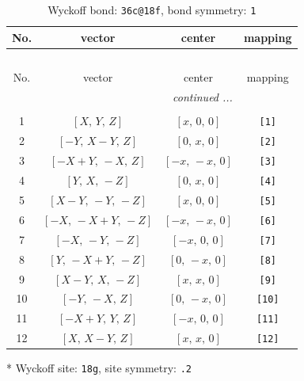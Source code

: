 \documentclass[fleqn,8pt]{jsarticle}
\begin{document}
\begin{longtable}{cccc}
\caption{Wyckoff bond: {\tt 36c@18f}, bond symmetry: {\tt 1}}
 \\
 \hline \hline
No. & vector & center & mapping \\ \hline \endfirsthead

\multicolumn{3}{l}{\tablename\ \thetable{}} \\
 \hline \hline
No. & vector & center & mapping \\ \hline \endhead

 \hline \hline
\multicolumn{3}{r}{\footnotesize\it continued ...} \\ \endfoot

 \hline \hline
\multicolumn{3}{r}{} \\ \endlastfoot

1 & $\left[ X,\, Y,\, Z \right]$ & $\left[ x,\, 0,\, 0 \right]$ & {\tt [1]} \\ \hline
2 & $\left[ - Y,\, X - Y,\, Z \right]$ & $\left[ 0,\, x,\, 0 \right]$ & {\tt [2]} \\ \hline
3 & $\left[ - X + Y,\, - X,\, Z \right]$ & $\left[ - x,\, - x,\, 0 \right]$ & {\tt [3]} \\ \hline
4 & $\left[ Y,\, X,\, - Z \right]$ & $\left[ 0,\, x,\, 0 \right]$ & {\tt [4]} \\ \hline
5 & $\left[ X - Y,\, - Y,\, - Z \right]$ & $\left[ x,\, 0,\, 0 \right]$ & {\tt [5]} \\ \hline
6 & $\left[ - X,\, - X + Y,\, - Z \right]$ & $\left[ - x,\, - x,\, 0 \right]$ & {\tt [6]} \\ \hline
7 & $\left[ - X,\, - Y,\, - Z \right]$ & $\left[ - x,\, 0,\, 0 \right]$ & {\tt [7]} \\ \hline
8 & $\left[ Y,\, - X + Y,\, - Z \right]$ & $\left[ 0,\, - x,\, 0 \right]$ & {\tt [8]} \\ \hline
9 & $\left[ X - Y,\, X,\, - Z \right]$ & $\left[ x,\, x,\, 0 \right]$ & {\tt [9]} \\ \hline
10 & $\left[ - Y,\, - X,\, Z \right]$ & $\left[ 0,\, - x,\, 0 \right]$ & {\tt [10]} \\ \hline
11 & $\left[ - X + Y,\, Y,\, Z \right]$ & $\left[ - x,\, 0,\, 0 \right]$ & {\tt [11]} \\ \hline
12 & $\left[ X,\, X - Y,\, Z \right]$ & $\left[ x,\, x,\, 0 \right]$ & {\tt [12]} \\
\end{longtable}
* Wyckoff site: {\tt 18g}, site symmetry: {\tt .2}
\renewcommand{\arraystretch}{1.2}
\end{document}
